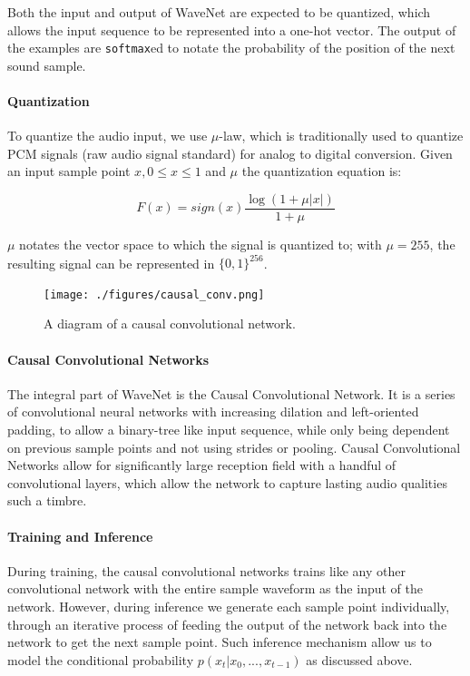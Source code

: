 \documentclass[]{report}
\begin{document}
Both the input and output of WaveNet are expected to be quantized, which
allows the input sequence to be represented into a one-hot vector. The
output of the examples are \texttt{softmax}ed to notate the probability
of the position of the next sound sample.

\paragraph{Quantization}

To quantize the audio input, we use \(\mu\)-law, which is traditionally
used to quantize PCM signals (raw audio signal standard) for analog to
digital conversion. Given an input sample point \(x, 0 \leq x \leq 1\)
and \(\mu\) the quantization equation is:

\begin{equation}
    F(x) = sign(x) \frac{\log(1 + \mu \lvert x \lvert )}{1 +  \mu} \label{eq:mulaw}
\end{equation}

\(\mu\) notates the vector space to which the signal is quantized to;
with \(\mu = 255\), the resulting signal can be represented in
\(\{0, 1\}^{256}\).

\begin{figure}[h]
    \texttt{[image: ./figures/causal\_conv.png]}
    \centering
    \caption{A diagram of a causal convolutional network.} \label{fig:causal_conv}
\end{figure}

\paragraph{Causal Convolutional Networks}

The integral part of WaveNet is the Causal Convolutional Network. It is
a series of convolutional neural networks with increasing dilation and
left-oriented padding, to allow a binary-tree like input sequence, while
only being dependent on previous sample points and not using strides or
pooling. Causal Convolutional Networks allow for significantly large
reception field with a handful of convolutional layers, which allow the
network to capture lasting audio qualities such a timbre.

\paragraph{Training and Inference}

During training, the causal convolutional networks trains like any other
convolutional network with the entire sample waveform as the input of
the network. However, during inference we generate each sample point
individually, through an iterative process of feeding the output of the
network back into the network to get the next sample point. Such
inference mechanism allow us to model the conditional probability
\(p(x_t | x_0, ..., x_{t-1})\) as discussed above.
\end{document}
